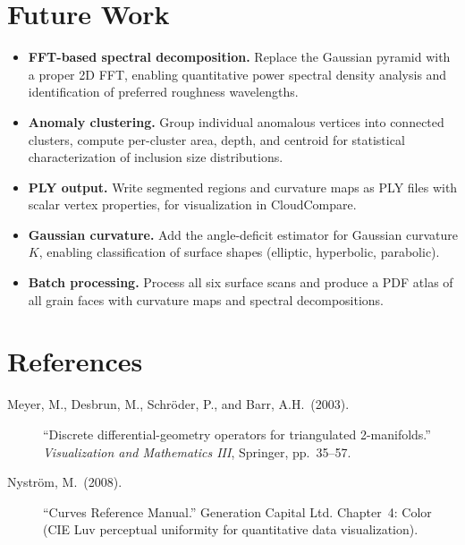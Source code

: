 \documentclass[11pt]{article}
\begin{document}
\section{Future Work}

\begin{itemize}
\item \textbf{FFT-based spectral decomposition.}  Replace the
  Gaussian pyramid with a proper 2D FFT, enabling quantitative
  power spectral density analysis and identification of preferred
  roughness wavelengths.

\item \textbf{Anomaly clustering.}  Group individual anomalous
  vertices into connected clusters, compute per-cluster area,
  depth, and centroid for statistical characterization of
  inclusion size distributions.

\item \textbf{PLY output.}  Write segmented regions and curvature
  maps as PLY files with scalar vertex properties, for
  visualization in CloudCompare.

\item \textbf{Gaussian curvature.}  Add the angle-deficit
  estimator for Gaussian curvature $K$, enabling classification of
  surface shapes (elliptic, hyperbolic, parabolic).

\item \textbf{Batch processing.}  Process all six surface scans
  and produce a PDF atlas of all grain faces with curvature maps
  and spectral decompositions.

\end{itemize}

\section*{References}

\begin{description}
\item[Meyer, M., Desbrun, M., Schr\"oder, P., and Barr, A.H.\ (2003).]
  ``Discrete differential-geometry operators for triangulated
  2-manifolds.'' \textit{Visualization and Mathematics III},
  Springer, pp.\ 35--57.

\item[Nystr\"om, M.\ (2008).]
  ``Curves Reference Manual.''  Generation Capital Ltd.  Chapter~4:
  Color (CIE Luv perceptual uniformity for quantitative data
  visualization).
\end{description}
\end{document}

